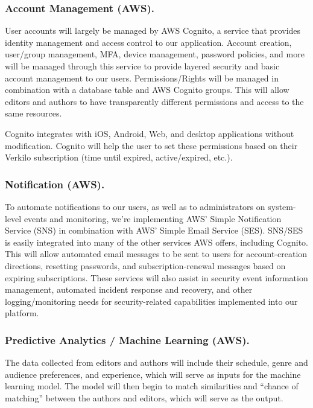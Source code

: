 \documentclass[10pt,openany]{book}
\begin{document}
\hypertarget{account-management-aws.}{%
\subsubsection{Account Management
(AWS).}\label{account-management-aws.}}

User accounts will largely be managed by AWS Cognito, a service that
provides identity management and access control to our application.
Account creation, user/group management, MFA, device management,
password policies, and more will be managed through this service to
provide layered security and basic account management to our users.
Permissions/Rights will be managed in combination with a database table
and AWS Cognito groups. This will allow editors and authors to have
transparently different permissions and access to the same resources.

Cognito integrates with iOS, Android, Web, and desktop applications
without modification. Cognito will help the user to set these
permissions based on their Verkilo subscription (time until expired,
active/expired, etc.).

\hypertarget{notification-aws.}{%
\subsubsection{Notification (AWS).}\label{notification-aws.}}

To automate notifications to our users, as well as to administrators on
system-level events and monitoring, we're implementing AWS' Simple
Notification Service (SNS) in combination with AWS' Simple Email Service
(SES). SNS/SES is easily integrated into many of the other services AWS
offers, including Cognito. This will allow automated email messages to
be sent to users for account-creation directions, resetting passwords,
and subscription-renewal messages based on expiring subscriptions. These
services will also assist in security event information management,
automated incident response and recovery, and other logging/monitoring
needs for security-related capabilities implemented into our platform.

\hypertarget{predictive-analytics-machine-learning-aws.}{%
\subsubsection{Predictive Analytics / Machine Learning
(AWS).}\label{predictive-analytics-machine-learning-aws.}}

The data collected from editors and authors will include their schedule,
genre and audience preferences, and experience, which will serve as
inputs for the machine learning model. The model will then begin to
match similarities and ``chance of matching'' between the authors and
editors, which will serve as the output.
\end{document}
